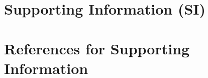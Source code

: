 \documentclass[../main.tex]{subfiles}
\begin{document}
\setcounter{page}{1}
\setcounter{section}{0}
\setcounter{figure}{0}
\setcounter{table}{0}
\setcounter{equation}{0}
\renewcommand{\thepage}{SI~\arabic{page}}
\renewcommand{\thesection}{SI.\arabic{section}}
\renewcommand{\thefigure}{SI.\arabic{figure}}
\renewcommand{\thetable}{SI.\arabic{table}}
\renewcommand{\theequation}{SI.\arabic{equation}}
\clearpage
\section*{{Supporting Information (SI)}}

\clearpage

\clearpage

\clearpage

\clearpage

\clearpage

\clearpage

\clearpage
\section{References for Supporting Information}

\printbibliography[heading=none]
\end{document}
